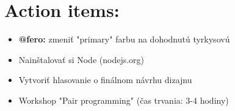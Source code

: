 \documentclass{article}
\begin{document}
    \section*{Action items:}

    \begin{itemize}
        \item \textbf {@fero:} zmeniť "primary" farbu na dohodnutú tyrkysovú 
        \item Nainštalovať si Node (nodejs.org)
        \item Vytvoriť hlasovanie o finálnom návrhu dizajnu
        \item Workshop "Pair programming" (čas trvania: 3-4 hodiny)
    \end{itemize}
\end{document}
